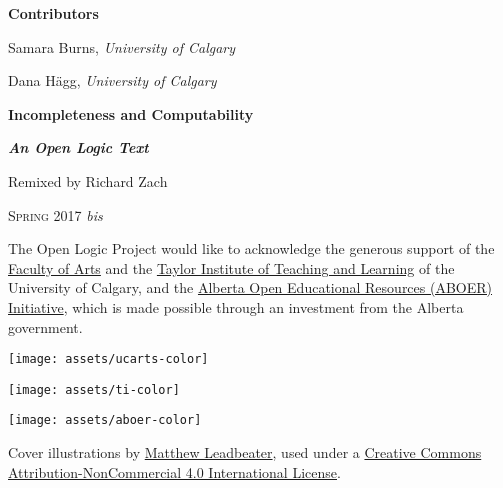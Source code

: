 \textbf{\color{leadbeater}Contributors}

\medskip

Samara Burns, \emph{University of Calgary}

Dana H\"agg, \emph{University of Calgary}

\newpage


\vspace*{100pt}

\begin{raggedleft}

{\fontsize{24pt}{24pt}\selectfont\bfseries\sffamily%
  Incompleteness and Computability}

\smallskip

{\fontsize{18pt}{18pt}\selectfont\bfseries\itshape An Open Logic Text}

\vspace{100pt}

\fontsize{14pt}{14pt}\selectfont Remixed by Richard Zach

\vfill

\textsc{Spring 2017} \textit{bis}

\end{raggedleft}


\newpage


\noindent
The Open Logic Project would like to acknowledge the generous support
of the \href{http://arts.ucalgary.ca/}{Faculty of Arts} and
the \href{http://www.ucalgary.ca/taylorinstitute/}{Taylor Institute of
Teaching and Learning} of the University of Calgary,
and the \href{http://albertaoer.com}{Alberta Open Educational Resources
(ABOER) Initiative}, which is made possible through an investment from
the Alberta government.



\bigskip

\noindent\texttt{[image: assets/ucarts-color]}

\medskip

\noindent\texttt{[image: assets/ti-color]}

\medskip

\noindent\texttt{[image: assets/aboer-color]}

\vfill

\noindent Cover illustrations by \href{http://mattleadbeater.com}{Matthew
  Leadbeater}, used under a
\href{http://creativecommons.org/licenses/by-nc/4.0/}{Creative Commons
  Attribution-NonCommercial 4.0 International License}.

